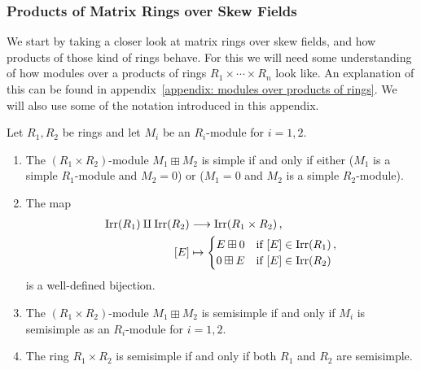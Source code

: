 \subsubsection{Products of Matrix Rings over Skew Fields}


\begin{fluff}
  We start by taking a closer look at matrix rings over skew fields, and how products of those kind of rings behave.
  For this we will need some understanding of how modules over a products of rings $R_1 \times \dotsb \times R_n$ look like.
  An explanation of this can be found in appendix~\ref{appendix: modules over products of rings}.
  We will also use some of the notation introduced in this appendix.
\end{fluff}


\begin{proposition}
  \label{proposition: product of semisimple}
  Let $R_1, R_2$ be rings and let $M_i$ be an $R_i$-module for $i = 1, 2$.
  \begin{enumerate}
    \item
      \label{enumerate: when boxplus is simple}
      The $(R_1 \times R_2)$-module $M_1 \boxplus M_2$ is simple if and only if either ($M_1$ is a simple $R_1$-module and $M_2 = 0$) or ($M_1 = 0$ and $M_2$ is a simple $R_2$-module).
    \item
      The map
      \begin{align*}
                  \operatorname{Irr}(R_1) \amalg \operatorname{Irr}(R_2)
        &\longrightarrow  \operatorname{Irr}(R_1 \times R_2) \,,
        \\
                  [E]
        &\mapsto  \begin{cases}
                    E \boxplus 0  & \text{if $[E] \in \operatorname{Irr}(R_1)$} \,, \\
                    0 \boxplus E  & \text{if $[E] \in \operatorname{Irr}(R_2)$}
                  \end{cases}
      \end{align*}
      is a well-defined bijection.
    \item
      \label{enumerate: when boxplus is semisimple}
      The $(R_1 \times R_2)$-module $M_1 \boxplus M_2$ is semisimple if and only if $M_i$ is semisimple as an $R_i$-module for $i = 1, 2$.
    \item
      The ring $R_1 \times R_2$ is semisimple if and only if both $R_1$ and $R_2$ are semisimple.
  \end{enumerate}
\end{proposition}



